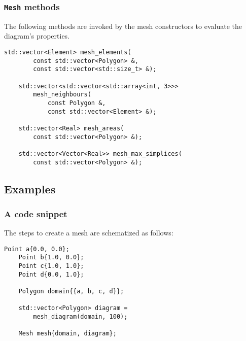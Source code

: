 \begin{frame}[fragile]
    \frametitle{\lstinline{Mesh} methods}

    The following methods are invoked by the mesh constructors to evaluate the diagram's properties.

    \begin{lstlisting}[style=cpp]
    std::vector<Element> mesh_elements(
        const std::vector<Polygon> &, 
        const std::vector<std::size_t> &);

    std::vector<std::vector<std::array<int, 3>>> 
        mesh_neighbours(
            const Polygon &, 
            const std::vector<Element> &);

    std::vector<Real> mesh_areas(
        const std::vector<Polygon> &);

    std::vector<Vector<Real>> mesh_max_simplices(
        const std::vector<Polygon> &);
    \end{lstlisting}

\end{frame}

\subsection{Examples}

\begin{frame}[fragile]
    \frametitle{A code snippet}

    The steps to create a mesh are schematized as follows:

    \begin{lstlisting}[style=cpp]
    Point a{0.0, 0.0};
    Point b{1.0, 0.0};
    Point c{1.0, 1.0};
    Point d{0.0, 1.0};

    Polygon domain{{a, b, c, d}};

    std::vector<Polygon> diagram = 
        mesh_diagram(domain, 100);
    
    Mesh mesh{domain, diagram};
    \end{lstlisting}

\end{frame}

